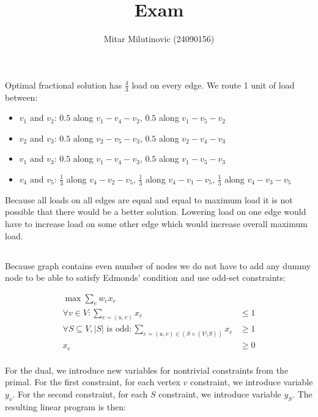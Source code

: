 \documentclass[a4paper,11pt,oneside,onecolumn]{article}
\title{Exam}
\author{Mitar Milutinovic (24090156)}
\begin{document}
\maketitle

\section{}

\subsection{}

Optimal fractional solution has $\frac{4}{3}$ load on every edge. We route 1 unit of load between:
\begin{itemize}
\item $v_1$ and $v_2$: $0.5$ along $v_1-v_4-v_2$, $0.5$ along $v_1-v_5-v_2$
\item $v_2$ and $v_3$: $0.5$ along $v_2-v_5-v_3$, $0.5$ along $v_2-v_4-v_3$
\item $v_1$ and $v_3$: $0.5$ along $v_1-v_4-v_3$, $0.5$ along $v_1-v_5-v_3$
\item $v_4$ and $v_5$: $\frac{1}{3}$ along $v_4-v_2-v_5$, $\frac{1}{3}$ along $v_4-v_1-v_5$, $\frac{1}{3}$ along $v_4-v_3-v_5$
\end{itemize}

Because all loads on all edges are equal and equal to maximum load it is not possible that there would be a better solution.
Lowering load on one edge would have to increase load on some other edge which would increase overall maximum load.

\subsection{}

Because graph contains even number of nodes we do not have to add any dummy node to be able to satisfy Edmonds' condition and
use odd-set constraints:

\begin{align*}
\max \sum_e w_e x_e &  \\
\forall v \in V: \sum_{e=(u,v)} x_e & \le 1 \\
\forall S \subseteq V, |S| \textrm{ is odd}: \sum_{e=(u,v) \in (S \times (V \setminus S))} x_e & \ge 1 \\
x_e & \ge 0 \\
\end{align*}

For the dual, we introduce new variables for nontrivial constraints from the primal. For the first constraint, for each
vertex $v$ constraint, we introduce variable $y_v$. For the second constraint, for each $S$ constraint, we introduce variable
$y_S$. The resulting linear program is then:
\end{document}
